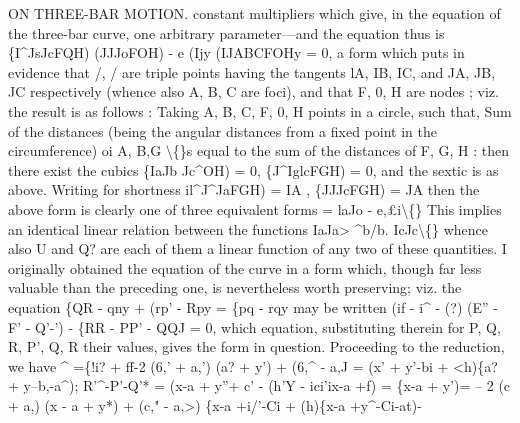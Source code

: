\documentclass[11pt,a4paper]{book}
\begin{document}
ON THREE-BAR MOTION.
constant
multipliers
which
give,
in
the
equation
of the
three-bar
curve,
one
arbitrary
parameter---and the equation thus
is
\{I\textasciicircum{}JsJcFQH) (JJJoFOH) - e (Ijy (IJABCFOHy = 0,
a
form
which
puts
in
evidence
that
/, /
are
triple
points
having
the
tangents
lA,
IB, IC,
and JA, JB, JC
respectively
(whence
also
A,
B, C
are
foci),
and
that
F,
0, H are nodes
;
viz. the
result
is as
follows
:
Taking
A,
B,
C,
F,
0, H
points
in
a
circle,
such
that, Sum
of
the
distances
(being the angular distances from a fixed point in the circumference) oi A, B,G \textbackslash\{\}s equal
to the sum
of
the
distances of F,
G, H
: then there
exist the
cubics \{IaJb Jc\textasciicircum{}OH) = 0,
\{J\textasciicircum{}IglcFGH) = 0, and the
sextic
is as above.
Writing for shortness
il\textasciicircum{}J\textasciicircum{}JaFGH) = IA
,
\{JJJcFGH) = JA
then the above form
is
clearly one of three equivalent forms
= laJo - e,\pounds{}i\textbackslash\{\}
This implies an identical
linear relation between
the
functions IaJa> \textasciicircum{}b/b. IcJc\textbackslash\{\} whence
also U and Q? are
each
of them a
linear
function
of any two
of these quantities.
I
originally obtained
the
equation
of
the
curve
in
a form
which, though
far
less
valuable than the preceding one,
is nevertheless worth preserving;
viz. the
equation
\{QR - qny + (rp' - Rpy = \{pq - rqy
may be written
(if - i\textasciicircum{} - (?) (E'' - F' - Q'-') - \{RR - PP' - QQJ = 0,
which
equation, substituting therein
for
P,
Q, R,
P', Q, R
their
values, gives
the form
in question.
Proceeding to the
reduction, we have
\textasciicircum{}
=\{!i? + ff-2 (6,' + a,') (a? + y') + (6,\textasciicircum{} - a,J
= (x' + y'-bi + <h)\{a? + y--b,-a\textasciicircum{});
R'\textasciicircum{}-P'\guillemotright{}-Q'* = (x-a + y''+ c' - (h'Y - ici'ix-a +f)
= \{x-a + y')= -- 2 (c\guillemotright{} + a,\guillemotright{}) (x - a + y*) + (c," - a,>)\guillemotleft{}
\{x-a +i/'-Ci + (h)\{x-a +y\textasciicircum{}-Ci-at)-
\end{document}
